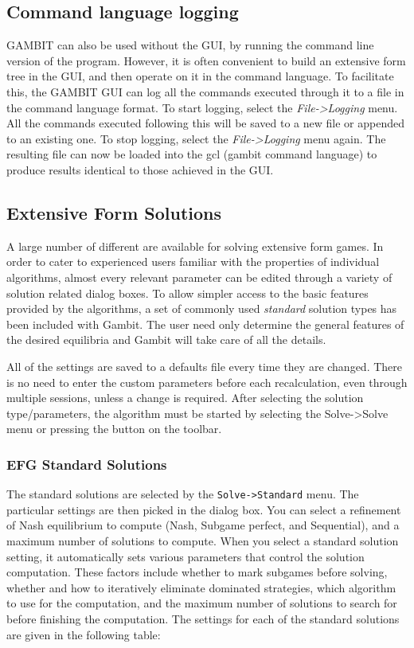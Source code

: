 \subsection{Command language logging}
GAMBIT can also be used without the GUI, by running the command line
version of the program.  However, it is often convenient to build an
extensive form tree in the GUI, and then operate on it in the command
language.  To facilitate this, the GAMBIT GUI can log all the commands
executed through it to a file in the command language format.  To start
logging, select the {\em File->Logging} menu.  All the commands executed
following this will be saved to a new file or appended to an existing one.
To stop logging, select the {\em File->Logging} menu again.  The resulting
file can now be loaded into the gcl (gambit command language) to produce
results identical to those achieved in the GUI.



\subsection{Extensive Form Solutions}
A large number of different  are 
available for solving extensive form
games.  In order to cater to experienced users familiar with the 
properties of individual algorithms, almost every relevant parameter can
be edited through a variety of solution related dialog boxes.  To allow 
simpler access to the basic features provided by the algorithms, a set of
commonly used {\em standard} solution types has been included with Gambit.
The user need only determine the general features of the desired equilibria
and Gambit will take care of all the details.

All of
the settings are saved to a defaults file every time they are changed. There
is no need to enter the custom parameters before each recalculation, even
through multiple sessions, unless a change is required.
After selecting the solution type/parameters, the algorithm must be started
by selecting the Solve->Solve menu or pressing the button on the toolbar.

\subsubsection{EFG Standard Solutions}\label{EFGStandardSolutions}
The standard solutions are selected by the {\tt Solve->Standard} menu.  The
particular settings are then picked in the dialog box.  You can select a 
refinement of Nash equilibrium to compute (Nash, Subgame perfect, and Sequential), 
and a maximum number of solutions to 
compute.  When you select a standard solution setting, it automatically sets various 
parameters that control the solution computation.  These factors include whether to mark 
subgames before solving, whether and how to iteratively eliminate dominated strategies, 
which algorithm to use for the computation, and the maximum number of solutions to search for 
before finishing the computation.  The settings for each of the standard solutions are 
given in the following table:

